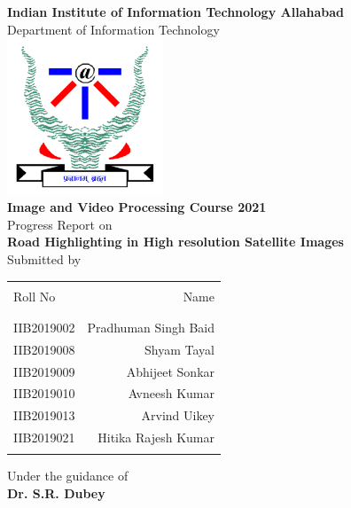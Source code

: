 \documentclass[12pt,a4paper]{article}
\begin{document}
\begin{titlepage}
\begin{center}
\textup{\large{\bf Indian Institute of Information Technology Allahabad} \\ Department of Information Technology}\\[0.2in]
\includegraphics[width=0.35\textwidth]{./pictures/iiita_logo.png}\\[0.25in]
\Large \textbf {Image and Video Processing Course 2021}\\
       {Progress Report on \\ \bf Road Highlighting in High resolution Satellite Images}\\[0.25in]

\normalsize Submitted by \\
\begin{table}[h]
\centering
\begin{tabular}{lr}
\hline \\
Roll No & Name \\
\\
\hline
\\
IIB2019002 & Pradhuman Singh Baid \\
IIB2019008 & Shyam Tayal \\
IIB2019009 & Abhijeet Sonkar \\
IIB2019010 & Avneesh Kumar \\
IIB2019013 & Arvind Uikey \\
IIB2019021 & Hitika Rajesh Kumar \\
\\
\hline
\end{tabular}
\end{table}

\vspace{.1in}
Under the guidance of\\
{\textbf{Dr. S.R. Dubey}}\\[0.1in]
\vfill
\end{center}
\end{titlepage}
\end{document}
